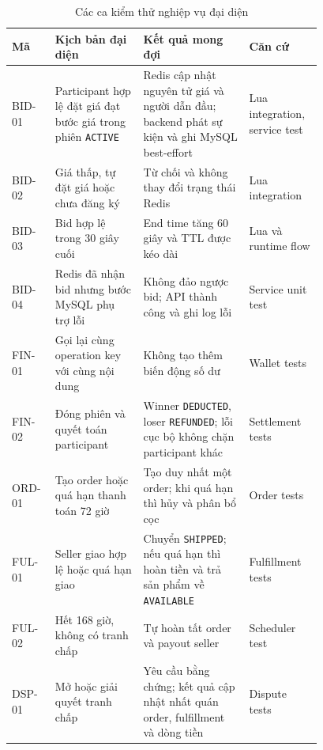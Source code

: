 \documentclass[../DoAn.tex]{subfiles}
\begin{document}
\begin{table}[H]
\centering
\scriptsize
\renewcommand{\arraystretch}{1.12}
\begin{tabular}{|>{\centering\arraybackslash}p{0.08\linewidth}|
                >{\raggedright\arraybackslash}p{0.25\linewidth}|
                >{\raggedright\arraybackslash}p{0.30\linewidth}|
                >{\raggedright\arraybackslash}p{0.15\linewidth}|}
\hline
\textbf{Mã} & \textbf{Kịch bản đại diện} & \textbf{Kết quả mong đợi} & \textbf{Căn cứ} \\ \hline
BID-01 & Participant hợp lệ đặt giá đạt bước giá trong phiên \texttt{ACTIVE} & Redis cập nhật nguyên tử giá và người dẫn đầu; backend phát sự kiện và ghi MySQL best-effort & Lua integration, service test \\ \hline
BID-02 & Giá thấp, tự đặt giá hoặc chưa đăng ký & Từ chối và không thay đổi trạng thái Redis & Lua integration \\ \hline
BID-03 & Bid hợp lệ trong 30 giây cuối & End time tăng 60 giây và TTL được kéo dài & Lua và runtime flow \\ \hline
BID-04 & Redis đã nhận bid nhưng bước MySQL phụ trợ lỗi & Không đảo ngược bid; API thành công và ghi log lỗi & Service unit test \\ \hline
FIN-01 & Gọi lại cùng operation key với cùng nội dung & Không tạo thêm biến động số dư & Wallet tests \\ \hline
FIN-02 & Đóng phiên và quyết toán participant & Winner \texttt{DEDUCTED}, loser \texttt{REFUNDED}; lỗi cục bộ không chặn participant khác & Settlement tests \\ \hline
ORD-01 & Tạo order hoặc quá hạn thanh toán 72 giờ & Tạo duy nhất một order; khi quá hạn thì hủy và phân bổ cọc & Order tests \\ \hline
FUL-01 & Seller giao hợp lệ hoặc quá hạn giao & Chuyển \texttt{SHIPPED}; nếu quá hạn thì hoàn tiền và trả sản phẩm về \texttt{AVAILABLE} & Fulfillment tests \\ \hline
FUL-02 & Hết 168 giờ, không có tranh chấp & Tự hoàn tất order và payout seller & Scheduler test \\ \hline
DSP-01 & Mở hoặc giải quyết tranh chấp & Yêu cầu bằng chứng; kết quả cập nhật nhất quán order, fulfillment và dòng tiền & Dispute tests \\ \hline
\end{tabular}
\caption{Các ca kiểm thử nghiệp vụ đại diện}
\label{tab:representative-test-cases}
\end{table}
\end{document}
